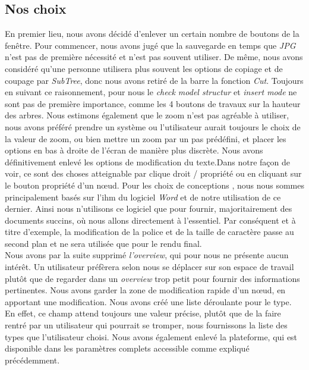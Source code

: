 \documentclass[12pt, a4paper]{article}
\begin{document}
\textcolor{NavyBlue}{\subsection{Nos choix}}

En premier lieu, nous avons décidé d'enlever un certain nombre de boutons de la fenêtre. Pour commencer, nous avons jugé que la sauvegarde en temps que \emph{JPG} n'est pas de première nécessité et n'est pas souvent utiliser. De même, nous avons considéré qu'une personne utilisera plus souvent les options de copiage et de coupage par \emph{SubTree}, donc nous avons retiré de la barre la fonction \emph{Cut}. Toujours en suivant ce raisonnement, pour nous le \emph{check model structur} et \emph{insert mode} ne sont pas de première importance, comme les 4 boutons de travaux sur la hauteur des arbres. Nous estimons également que le zoom n'est pas agréable à utiliser, nous avons préféré prendre un système ou l'utilisateur aurait toujours le choix de la valeur de zoom, ou bien mettre un zoom par un pas prédéfini, et placer les options en bas à droite de l'écran de manière plus discrète. Nous avons définitivement enlevé les options de modification du texte.Dans notre façon de voir, ce sont des choses atteignable par clique droit / propriété ou en cliquant sur le bouton propriété d'un nœud. Pour les choix de conceptions , nous nous sommes principalement basés sur l'ihm du logiciel \emph{Word} et de notre utilisation de ce dernier. Ainsi nous n'utilisons ce logiciel que pour fournir, majoritairement des documents succins, où nous allons directement à l'essentiel. Par conséquent et à titre d'exemple, la modification de la police et de la taille de caractère passe au second plan et ne sera utilisée que pour le rendu final.\\


Nous avons par la suite supprimé \emph{l'overview}, qui pour nous ne présente aucun intérêt. Un utilisateur préfèrera selon nous se déplacer sur son espace de travail plutôt que de regarder dans un \emph{overview} trop petit pour fournir des informations pertinentes. Nous avons garder la zone de modification rapide d'un nœud, en apportant une modification. Nous avons créé une liste déroulante pour le type. En effet, ce champ attend toujours une valeur précise, plutôt que de la faire rentré par un utilisateur qui pourrait se tromper, nous fournissons la liste des types que l'utilisateur choisi. Nous avons également enlevé la plateforme, qui est disponible dans les paramètres complets accessible comme expliqué précédemment.\\
\end{document}
